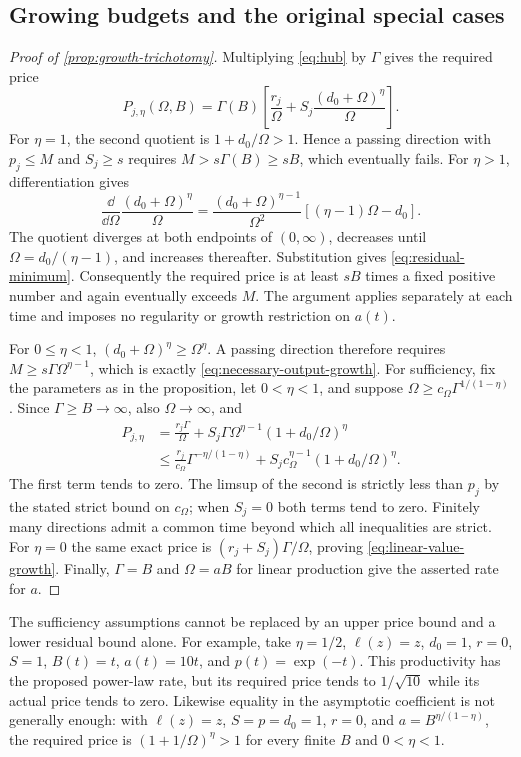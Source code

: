 \subsection{Growing budgets and the original special cases}
\label{app:growth-proof}
\begin{proof}[Proof of \cref{prop:growth-trichotomy}]
Multiplying \cref{eq:hub} by $\Gamma$ gives the required price
\[
 P_{j,\eta}(\Omega,B)=\Gamma(B)
 \left[\frac{r_j}{\Omega}
       +S_j\frac{(d_0+\Omega)^\eta}{\Omega}\right].
\]
For $\eta=1$, the second quotient is $1+d_0/\Omega>1$.
Hence a passing direction with $p_j\leq M$ and $S_j\geq s$ requires
$M>s\Gamma(B)\geq sB$, which eventually fails.
For $\eta>1$, differentiation gives
\[
 \frac{\dd}{\dd\Omega}\frac{(d_0+\Omega)^\eta}{\Omega}
 =\frac{(d_0+\Omega)^{\eta-1}}{\Omega^2}
       [(\eta-1)\Omega-d_0].
\]
The quotient diverges at both endpoints of $(0,\infty)$, decreases
until $\Omega=d_0/(\eta-1)$, and increases thereafter. Substitution
gives \cref{eq:residual-minimum}. Consequently the required price is
at least $sB$ times a fixed positive number and again eventually exceeds
$M$. The argument applies separately at each time and imposes no
regularity or growth restriction on $a(t)$.

For $0\leq\eta<1$, $(d_0+\Omega)^\eta\geq\Omega^\eta$.
A passing direction therefore requires
$M\geq s\Gamma\Omega^{\eta-1}$, which is exactly
\cref{eq:necessary-output-growth}. For sufficiency, fix the parameters
as in the proposition, let $0<\eta<1$, and suppose
$\Omega\geq c_\Omega\Gamma^{1/(1-\eta)}$. Since
$\Gamma\geq B\to\infty$, also $\Omega\to\infty$, and
\begin{align*}
 P_{j,\eta}
 &=\frac{r_j\Gamma}{\Omega}
   +S_j\Gamma\Omega^{\eta-1}(1+d_0/\Omega)^\eta\\
 &\leq\frac{r_j}{c_\Omega}\Gamma^{-\eta/(1-\eta)}
   +S_jc_\Omega^{\eta-1}(1+d_0/\Omega)^\eta.
\end{align*}
The first term tends to zero. The limsup of the second is strictly
less than $p_j$ by the stated strict bound on $c_\Omega$; when $S_j=0$
both terms tend to zero. Finitely many directions admit a common time
beyond which all inequalities are strict. For $\eta=0$ the same exact
price is $(r_j+S_j)\Gamma/\Omega$, proving
\cref{eq:linear-value-growth}. Finally, $\Gamma=B$ and $\Omega=aB$
for linear production give the asserted rate for $a$.
\end{proof}

The sufficiency assumptions cannot be replaced by an upper price bound
and a lower residual bound alone. For example, take $\eta=1/2$,
$\ell(z)=z$, $d_0=1$, $r=0$, $S=1$, $B(t)=t$, $a(t)=10t$,
and $p(t)=\exp(-t)$. This productivity has the proposed power-law rate,
but its required price tends to $1/\sqrt{10}$ while its actual price
tends to zero. Likewise equality in the asymptotic coefficient is not
generally enough: with $\ell(z)=z$, $S=p=d_0=1$, $r=0$, and
$a=B^{\eta/(1-\eta)}$, the required price is
$(1+1/\Omega)^\eta>1$ for every finite $B$ and $0<\eta<1$.

